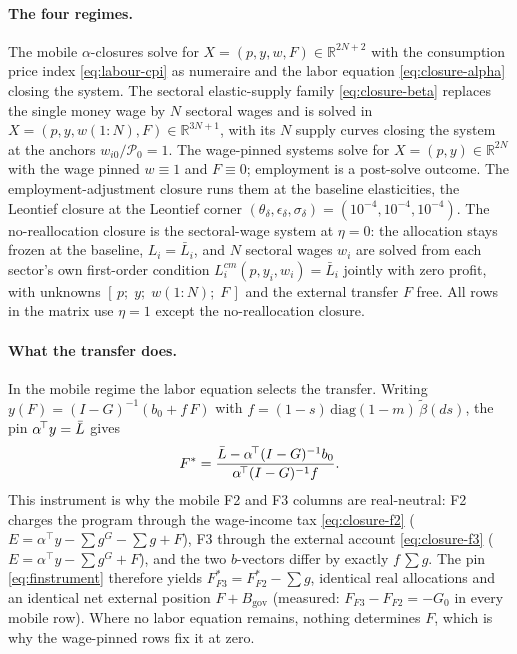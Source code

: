 \paragraph{The four regimes.} The mobile $\alpha$-closures solve for
$X = (p, y, w, F) \in \mathbb{R}^{2N+2}$ with the consumption price index
\eqref{eq:labour-cpi} as numeraire and the labor equation
\eqref{eq:closure-alpha} closing the system. The sectoral elastic-supply family
\eqref{eq:closure-beta} replaces the single money wage by $N$ sectoral wages and
is solved in $X = (p, y, w(1{:}N), F) \in \mathbb{R}^{3N+1}$, with its $N$ supply
curves closing the system at the anchors $w_{i0}/\mathcal{P}_0 = 1$. The wage-pinned systems solve for $X = (p, y) \in \mathbb{R}^{2N}$ with the
wage pinned $w \equiv 1$ and $F \equiv 0$; employment is a post-solve
outcome. The employment-adjustment closure runs them at the baseline elasticities,
the Leontief closure at the Leontief
corner $(\theta_\delta,\epsilon_\delta,\sigma_\delta) = (10^{-4},10^{-4},
10^{-4})$. The no-reallocation closure is the sectoral-wage system at
$\eta = 0$: the
allocation stays frozen at the baseline, $L_i = \bar{L}_i$, and $N$ sectoral
wages $w_i$ are solved from each sector's own first-order condition
$L^{cm}_i(p, y_i, w_i) = \bar{L}_i$ jointly with zero profit, with unknowns
$[\,p;\; y;\; w(1{:}N);\; F\,]$ and the external transfer $F$ free. All rows
in the matrix use $\eta = 1$ except the no-reallocation closure.

\paragraph{What the transfer does.} In the mobile regime the labor equation
selects the transfer. Writing $y(F) = (I-G)^{-1}(b_0 + f\,F)$ with
$f = (1-s)\,\mathrm{diag}(1-m)\,\tilde\beta(ds)$, the pin
$\alpha^{\!\top}y = \bar{L}$ gives
\begin{equation}
F^{\ast} = \frac{\bar{L} - \alpha^{\!\top}(I-G)^{-1} b_0}
               {\alpha^{\!\top}(I-G)^{-1} f}.
\label{eq:finstrument}
\end{equation}
This instrument is why the mobile F2 and F3 columns are real-neutral: F2
charges the program through the wage-income tax \eqref{eq:closure-f2} ($E = \alpha^{\!\top}y -
\sum g^G - \sum g + F$), F3 through the external account \eqref{eq:closure-f3} ($E = \alpha^{\!\top}y
- \sum g^G + F$), and the two $b$-vectors differ by exactly
$f\,\sum g$. The pin \eqref{eq:finstrument} therefore yields
$F^{\ast}_{F3} = F^{\ast}_{F2} - \sum g$, identical real allocations and an
identical net external position $F + B_{\mathrm{gov}}$ (measured:
$F_{F3} - F_{F2} = -G_0$ in every mobile row). Where no labor equation remains,
nothing determines $F$, which is why the wage-pinned rows fix it at zero.

